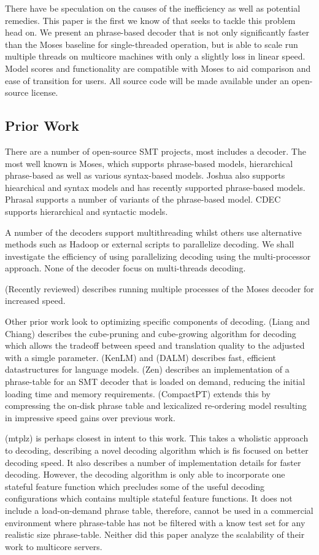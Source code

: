 \documentclass[11pt]{article}
\begin{document}
There have be speculation on the causes of the inefficiency as well as potential remedies. This paper is the first we know of that seeks to tackle this problem head on. We present an phrase-based decoder that is not only significantly faster than the Moses baseline for single-threaded operation, but is able to scale run multiple threads on multicore machines with only a slightly loss in linear speed. Model scores and functionality are compatible with Moses to aid comparison and ease of transition for users. All source code will be made available under an open-source license.

\subsection{Prior Work}

There are a number of open-source SMT projects, most includes a decoder. The most well known is Moses, which supports phrase-based models, hierarchical phrase-based as well as various syntax-based models. Joshua also supports hiearchical and syntax models and has recently supported phrase-based models. Phrasal supports a number of variants of the phrase-based model. CDEC supports hierarchical and syntactic models.

A number of the decoders support multithreading whilst others use alternative methods such as Hadoop or external scripts to parallelize decoding. We shall investigate the efficiency of using parallelizing decoding using the multi-processor approach. None of the decoder focus on multi-threads decoding. 

(Recently reviewed) describes running multiple processes of the Moses decoder for increased speed.

Other prior work look to optimizing specific components of decoding. (Liang and Chiang) describes the cube-pruning and cube-growing algorithm for decoding which allows the tradeoff between speed and translation quality to the adjusted with a simgle parameter. (KenLM) and (DALM) describes fast, efficient datastructures for language models. (Zen) describes an implementation of a phrase-table for an SMT decoder that is loaded on demand, reducing the initial loading time and memory requirements. (CompactPT) extends this by compressing the on-disk phrase table and lexicalized re-ordering model resulting in impressive speed gains over previous work.

(mtplz) is perhaps closest in intent to this work. This takes a wholistic approach to decoding, describing a novel decoding algorithm which is fis focused on better decoding speed. It also describes a number of implementation details for faster decoding. However, the decoding algorithm is only able to incorporate one stateful feature function which precludes some of the useful decoding configurations which contains multiple stateful feature functions. It does not include a load-on-demand phrase table, therefore, cannot be used in a commercial environment where phrase-table has not be filtered with a know test set for any realistic size phrase-table. Neither did this paper analyze the scalability of their work to multicore servers.
\end{document}
